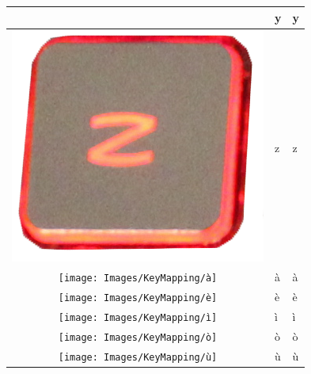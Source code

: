 \begin{longtable}{|cll|}
\begin{minipage}[c]{.4\textwidth}
\vspace{0.2cm}
\end{minipage} & y & y\\
\hline
\begin{minipage}[c]{.4\textwidth}
\vspace{0.2cm}
\includegraphics[scale=0.08]{Images/KeyMapping/z}
\vspace{0.2cm}
\end{minipage} & z & z\\
\hline
\begin{minipage}[c]{.4\textwidth}
\vspace{0.2cm}
\texttt{[image: Images/KeyMapping/à]}
\vspace{0.2cm}
\end{minipage} & à & à\\
\hline
\begin{minipage}[c]{.4\textwidth}
\vspace{0.2cm}
\texttt{[image: Images/KeyMapping/è]}
\vspace{0.2cm}
\end{minipage} & è & è\\
\hline
\begin{minipage}[c]{.4\textwidth}
\vspace{0.2cm}
\texttt{[image: Images/KeyMapping/ì]}
\vspace{0.2cm}
\end{minipage} & ì & ì\\
\hline
\begin{minipage}[c]{.4\textwidth}
\vspace{0.2cm}
\texttt{[image: Images/KeyMapping/ò]}
\vspace{0.2cm}
\end{minipage} & ò & ò\\
\hline
\begin{minipage}[c]{.4\textwidth}
\vspace{0.2cm}
\texttt{[image: Images/KeyMapping/ù]}
\vspace{0.2cm}
\end{minipage} & ù & ù\\
\hline
\end{longtable}
\normalsize
